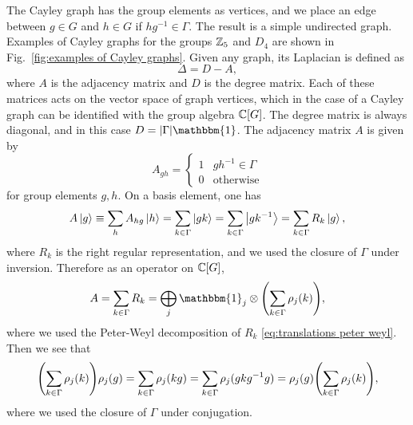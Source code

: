 The Cayley graph has the group elements as vertices, and we place an edge between $g \in G$ and $h \in G$ if $h g^{-1} \in \Gamma$.
The result is a simple undirected graph.
Examples of Cayley graphs for the groups $\mathbb{Z}_5$ and $D_4$ are shown in Fig.~\ref{fig:examples of Cayley graphs}.
Given any graph, its Laplacian is defined as \cite{spectralgraphtheory}
\begin{equation}
    \Delta = D-A,
\end{equation}
where $A$ is the adjacency matrix and $D$ is the degree matrix.
Each of these matrices acts on the vector space of graph vertices, which in the case of a Cayley graph can be identified with the group algebra $\mathbb{C}[G]$.
The degree matrix is always diagonal, and in this case $D=\abs{\Gamma} \mathbbm{1}$.
The adjacency matrix $A$ is given by
\begin{equation}
    A_{gh} = \begin{cases}1 & g h^{-1} \in \Gamma\\ 0 & \mathrm{otherwise}\end{cases}
\end{equation}
for group elements $g,h$.
On a basis element, one has
\begin{equation}
    A \ket{g} \equiv \sum_h A_{hg} \ket{h} = \sum_{k \in \Gamma} \ket{gk} = \sum_{k \in \Gamma} \ket{gk^{-1}} = \sum_{k \in \Gamma} R_k \ket{g},
\end{equation}
where $R_k$ is the right regular representation, and we used the closure of $\Gamma$ under inversion.
Therefore as an operator on $\mathbb{C}[G]$,
\begin{equation}
    A = \sum_{k \in \Gamma} R_k = \bigoplus_j \mathbbm{1}_j \otimes \pqty{\sum_{k \in \Gamma} \rho_j(k)},
\end{equation}
where we used the Peter-Weyl decomposition of $R_k$ \eqref{eq:translations peter weyl}.
Then we see that
\begin{equation}
    \pqty{\sum_{k \in \Gamma} \rho_j(k)} \rho_j(g) = \sum_{k \in \Gamma} \rho_j(kg) = \sum_{k \in \Gamma} \rho_j(g k g^{-1} g) = \rho_j(g) \pqty{\sum_{k \in \Gamma} \rho_j(k)},
\end{equation}
where we used the closure of $\Gamma$ under conjugation.

